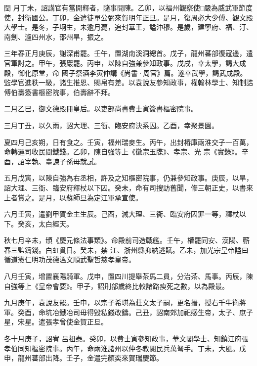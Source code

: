 \begin{pinyinscope}
 閏
 月丁未，詔講官有當開釋者，隨事開陳。乙卯，以福州觀察使□嚴為威武軍節度使，封衛國公。丁卯，金遣徒單公弼來賀明年正旦。是月，復周必大少傅、觀文殿大學士。是冬，子坰生，未逾月薨，追封華王，謚沖穆。是歲，建寧府、福、汀、南劍、瀘四州水，邵州旱，振之。



 三年春正月庚辰，謝深甫罷。壬午，置湖南溪洞總首。戊子，龍州蕃部復寇邊，遣官軍討之。甲午，張巖罷。丙申，以陳自強兼參知政事。戊戌，幸太學，謁大成殿，御化原堂，命
 國子祭酒李寅仲講《尚書·周官》篇。遂幸武學，謁武成殿。監學官進秩一級，諸生推恩、賜帛有差。以袁說友參知政事，權翰林學士、知制誥傅伯壽簽書樞密院事，伯壽辭不拜。



 二月乙巳，御文德殿冊皇后。以吏部尚書費士寅簽書樞密院事。



 三月丁丑，以久雨，詔大理、三衙、臨安府決系囚。乙酉，幸聚景園。



 夏四月己亥朔，日有食之。壬寅，福州瑞麥生。丙午，出封樁庫兩淮交子一百萬，命轉運司收民間鐵錢。乙卯，陳自強等上《徽宗玉牒》、孝宗、光
 宗《實錄》。辛酉，詔宰執、臺諫子孫毋就試。



 五月戊寅，以陳自強為右丞相，許及之知樞密院事，仍兼參知政事。庚辰，以旱，詔大理、三衙、臨安府釋杖以下囚。癸未，命有司搜訪舊聞，修三朝正史，以書來上者賞之。是月，以蘇師旦為定江軍承宣使。



 六月壬寅，遣劉甲賀金主生辰。己酉，減大理、三衙、臨安府囚罪一等，釋杖以下。癸亥，太白經天。



 秋七月辛未，頒《慶元條法事類》。命殿前司造戰艦。壬午，權罷同安、漢陽、蘄春三監鑄錢。白虹貫日。癸未，禁
 江、浙州縣抑納逃賦。乙未，加光宗皇帝謚曰循道憲仁明功茂德溫文順武聖哲慈孝皇帝。



 八月壬寅，增置襄陽騎軍。戊申，置四川提舉茶馬二員，分治茶、馬事。丙辰，陳自強等上《皇帝會要》。甲子，詔刑部歲終比較諸路瘐死之數，以為殿最。



 九月庚午，袁說友罷。壬申，以宗子希琪為莊文太子嗣，更名搢，授右千牛衛將軍。癸酉，命坑冶鐵冶司毋得毀私錢改鑄。己丑，詔南郊加祀感生帝，太子、庶子星，宋星。遣張孝曾使金賀正旦。



 冬十月庚子，詔宥
 呂祖泰。癸卯，以費士寅參知政事，華文閣學士、知鎮江府張孝伯同知樞密院事。丙午，命兩淮諸州以仲冬教閱民兵萬弩手。丁未，大風。戊申，龍州蕃部出降。壬子，金遣完顏奕來賀瑞慶節。




\end{pinyinscope}

